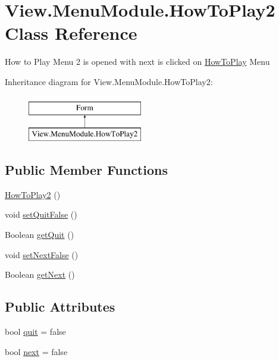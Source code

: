 \hypertarget{class_view_1_1_menu_module_1_1_how_to_play2}{}\section{View.\+Menu\+Module.\+How\+To\+Play2 Class Reference}
\label{class_view_1_1_menu_module_1_1_how_to_play2}


How to Play Menu 2 is opened with next is clicked on \hyperlink{class_view_1_1_menu_module_1_1_how_to_play}{How\+To\+Play} Menu  


Inheritance diagram for View.\+Menu\+Module.\+How\+To\+Play2\+:\begin{figure}[H]
\begin{center}
\leavevmode
\includegraphics[height=2.000000cm]{class_view_1_1_menu_module_1_1_how_to_play2}
\end{center}
\end{figure}
\subsection*{Public Member Functions}
\begin{DoxyCompactItemize}
\item 
\hyperlink{class_view_1_1_menu_module_1_1_how_to_play2_ac0069718a15c08929de5228baef2b805}{How\+To\+Play2} ()
\item 
void \hyperlink{class_view_1_1_menu_module_1_1_how_to_play2_a937e82de93a8ab6842574109cfc48683}{set\+Quit\+False} ()
\item 
Boolean \hyperlink{class_view_1_1_menu_module_1_1_how_to_play2_af3cfed592dae438daa6edc729fb4893f}{get\+Quit} ()
\item 
void \hyperlink{class_view_1_1_menu_module_1_1_how_to_play2_a05ea9b0ee4a7be839332c4fb6f709b98}{set\+Next\+False} ()
\item 
Boolean \hyperlink{class_view_1_1_menu_module_1_1_how_to_play2_a87c3fef50b6780fbe2ed6d7798849504}{get\+Next} ()
\end{DoxyCompactItemize}
\subsection*{Public Attributes}
\begin{DoxyCompactItemize}
\item 
bool \hyperlink{class_view_1_1_menu_module_1_1_how_to_play2_af31369fd9237a7c96ede9eb79d749223}{quit} = false
\item 
bool \hyperlink{class_view_1_1_menu_module_1_1_how_to_play2_af60010a959740d9fe7089ed0e2a979bc}{next} = false
\end{DoxyCompactItemize}
